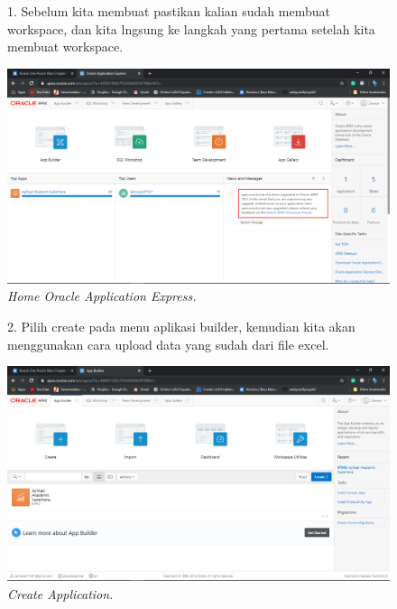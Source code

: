 \begin{enumerate}
    \begin{figure}[!htbp]
    \item[1.] Sebelum kita membuat pastikan kalian sudah membuat workspace, dan kita lngsung ke langkah yang pertama setelah kita membuat workspace.
        \begin{center}
        \includegraphics[scale=0.3]{figures/Screenshot(116).png}
        \caption{\textit{Home Oracle Application Express.}}
        \end{center}   
    \end{figure}
    
    \begin{figure}[!htbp]
    \item[2.] Pilih create pada menu aplikasi builder, kemudian kita akan menggunakan cara upload data yang sudah dari file excel.
        \begin{center}
        \includegraphics[scale=0.3]{figures/Screenshot(117).png}
        \caption{\textit{Create Application.}}
        \end{center}   
    \end{figure}


\end{enumerate}
